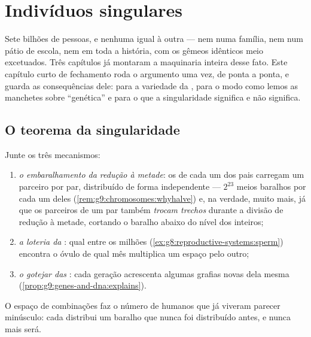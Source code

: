 \chapter{Indivíduos singulares}\label{ch:g9:unique-individuals}

Sete bilhões de pessoas, e nenhuma igual à outra --- nem numa
família, nem num pátio de escola, nem em toda a história, com
os gêmeos idênticos meio excetuados. Três capítulos já
montaram a maquinaria inteira desse fato. Este capítulo curto
de fechamento roda o argumento uma vez, de ponta a ponta, e
guarda as consequências dele: para a variedade da ,
para o modo como lemos as manchetes sobre ``genética'' e para
o que a singularidade significa e não significa.

\section{O teorema da singularidade}

\begin{proposition}\label{prop:g9:unique-individuals:theorem}
Junte os três mecanismos:
\begin{enumerate}
  \item \emph{o embaralhamento da redução à metade}: os
         de cada um dos pais carregam um parceiro por
        par, distribuído de forma independente --- $2^{23}$
        meios baralhos por cada um deles
        (\cref{rem:g9:chromosomes:whyhalve}) e, na verdade,
        muito mais, já que os parceiros de um par também
        \emph{trocam trechos} durante a divisão de redução à
        metade, cortando o baralho abaixo do nível dos
         inteiros;
  \item \emph{a loteria da }: qual 
        entre os milhões (\cref{ex:g8:reproductive-systems:sperm})
        encontra o óvulo de qual mês multiplica um espaço
        pelo outro;
  \item \emph{o gotejar das }: cada geração
        acrescenta algumas grafias novas dela mesma
        (\cref{prop:g9:genes-and-dna:explains}).
\end{enumerate}
O espaço de combinações faz o número de humanos que já
viveram parecer minúsculo: cada  distribui um
baralho que nunca foi distribuído antes, e nunca mais será.
\end{proposition}
\admitted

